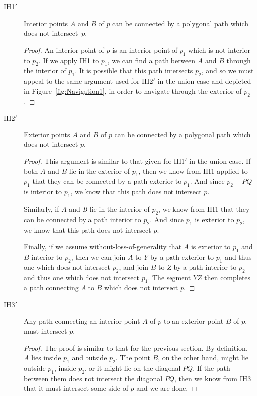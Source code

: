 \begin{description}
\item[IH1$'$] Interior points $A$ and $B$ of $p$ can be connected by a polygonal path which does not intersect~$p$.
  \begin{proof}
    An interior point of $p$ is an interior point of $p_1$ which is not interior to $p_2$. If we apply IH1 to $p_1$, we can find a path between $A$ and $B$ through the interior of $p_1$. It is possible that this path intersects $p_2$, and so we must appeal to the same argument used for IH2$'$ in the union case and depicted in Figure~\ref{fig:Navigation1}, in order to navigate through the exterior of $p_2$.
  \end{proof}
\item[IH2$'$] Exterior points $A$ and $B$ of $p$ can be connected by a polygonal path which does not intersect $p$.
  \begin{proof}
    This argument is similar to that given for IH1$'$ in the union case. If both $A$ and $B$ lie in the exterior of $p_1$, then we know from IH1 applied to $p_1$ that they can be connected by a path exterior to $p_1$. And since $p_2 - PQ$ is interior to $p_1$, we know that this path does not intersect $p$.

    Similarly, if $A$ and $B$ lie in the interior of $p_2$, we know from IH1 that they can be connected by a path interior to $p_2$. And since $p_1$ is exterior to $p_2$, we know that this path does not intersect $p$.

    Finally, if we assume without-loss-of-generality that $A$ is exterior to $p_1$ and $B$ interior to $p_2$, then we can join $A$ to $Y$ by a path exterior to $p_1$ and thus one which does not intersect $p_2$, and join $B$ to $Z$ by a path interior to $p_2$ and thus one which does not intersect $p_1$. The segment $YZ$ then completes a path connecting $A$ to $B$ which does not intersect $p$.
    \end{proof}

\item[IH3$'$] Any path connecting an interior point $A$ of $p$ to an exterior point $B$ of $p$, must intersect $p$.
  \begin{proof}
    The proof is similar to that for the previous section. By definition, $A$ lies inside $p_1$ and outside $p_2$. The point $B$, on the other hand, might lie outside $p_1$, inside $p_2$, or it might lie on the diagonal $PQ$. If the path between them does not intersect the diagonal $PQ$, then we know from IH3 that it must intersect some side of $p$ and we are done.


\end{proof}
\end{description}
